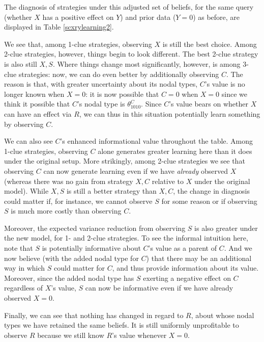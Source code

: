 \documentclass[12pt,]{book}
\begin{document}
The diagnosis of strategies under this adjusted set of beliefs, for the same query (whether \(X\) has a positive effect on \(Y\)) and prior data (\(Y=0\)) as before, are displayed in Table \ref{scxrylearning2}.

We see that, among 1-clue strategies, observing \(X\) is still the best choice. Among 2-clue strategies, however, things begin to look different. The best 2-clue strategy is also still \(X, S\). Where things change most significantly, however, is among 3-clue strategies: now, we can do even better by additionally observing \(C\). The reason is that, with greater uncertainty about its nodal types, \(C\)'s value is no longer known when \(X=0\): it is now possible that \(C=0\) when \(X=0\) since we think it possible that \(C\)'s nodal type is \(\theta^C_{1010}\). Since \(C\)'s value bears on whether \(X\) can have an effect via \(R\), we can thus in this situation potentially learn something by observing \(C\).

We can also see \(C\)'s enhanced informational value throughout the table. Among 1-clue strategies, observing \(C\) alone generates greater learning here than it does under the original setup. More strikingly, among 2-clue strategies we see that observing \(C\) can now generate learning even if we have \emph{already} observed \(X\) (whereas there was no gain from strategy \(X, C\) relative to \(X\) under the original model). While \(X, S\) is still a better strategy than \(X, C\), the change in diagnosis could matter if, for instance, we cannot observe \(S\) for some reason or if observing \(S\) is much more costly than observing \(C\).

Moreover, the expected variance reduction from observing \(S\) is also greater under the new model, for 1- and 2-clue strategies. To see the informal intuition here, note that \(S\) is potentially informative about \(C\)'s value as a parent of \(C\). And we now believe (with the added nodal type for \(C\)) that there may be an additional way in which \(S\) could matter for \(C\), and thus provide information about its value. Moreover, since the added nodal type has \(S\) exerting a negative effect on \(C\) regardless of \(X\)'s value, \(S\) can now be informative even if we have already observed \(X=0\).

Finally, we can see that nothing has changed in regard to \(R\), about whose nodal types we have retained the same beliefs. It is still uniformly unprofitable to observe \(R\) because we still know \(R\)'s value whenever \(X=0\).
\end{document}
